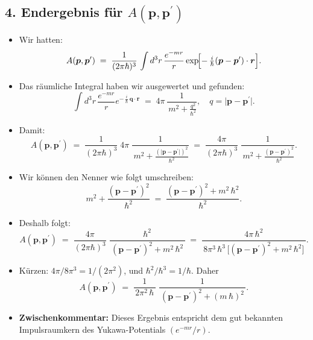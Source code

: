 \documentclass{scrartcl}
\begin{document}
\subsection*{4. Endergebnis für $A(\boldsymbol{p},\boldsymbol{p}^{\prime})$}
\begin{itemize}
  \item Wir hatten:
  \[
    A(\boldsymbol{p},\boldsymbol{p}^{\prime})
    \;=\;
    \frac{1}{(2\pi\hbar)^{3}}\,
    \int d^{3}r\,\frac{e^{-m r}}{r}
    \exp\!\Bigl[-\,\tfrac{i}{\hbar}(\boldsymbol{p}-\boldsymbol{p}^{\prime})\cdot\boldsymbol{r}\Bigr].
  \]
  \item Das räumliche Integral haben wir ausgewertet und gefunden:
  \[
    \int d^{3}r\,\frac{e^{-m r}}{r}
    e^{-\,\tfrac{i}{\hbar}\,\boldsymbol{q}\cdot\boldsymbol{r}}
    \;=\;
    4\pi\,
    \frac{1}{\,m^{2} + \tfrac{q^{2}}{\hbar^{2}}\!},
    \quad q = \lvert \boldsymbol{p} - \boldsymbol{p}^{\prime}\rvert.
  \]
  \item Damit:
  \[
    A(\boldsymbol{p},\boldsymbol{p}^{\prime})
    \;=\;
    \frac{1}{(2\pi\hbar)^{3}}\;
    4\pi\;\frac{1}{\,m^{2} + \tfrac{(\lvert \boldsymbol{p}-\boldsymbol{p}^{\prime}\rvert)^{2}}{\hbar^{2}}\!}
    \;=\;
    \frac{4\pi}{(2\pi\hbar)^{3}}\;
    \frac{1}{\,m^{2} + \tfrac{(\boldsymbol{p}-\boldsymbol{p}^{\prime})^{2}}{\hbar^{2}}\!}.
  \]
  \item Wir können den Nenner wie folgt umschreiben:
  \[
    m^{2} + \frac{(\boldsymbol{p}-\boldsymbol{p}^{\prime})^{2}}{\hbar^{2}}
    \;=\;
    \frac{(\boldsymbol{p}-\boldsymbol{p}^{\prime})^{2} + m^{2}\,\hbar^{2}}{\hbar^{2}}.
  \]
  \item Deshalb folgt:
  \[
    A(\boldsymbol{p},\boldsymbol{p}^{\prime})
    \;=\;
    \frac{4\pi}{(2\pi\hbar)^{3}}\;
    \frac{\hbar^{2}}{\,(\boldsymbol{p}-\boldsymbol{p}^{\prime})^{2} + m^{2}\,\hbar^{2}\,}
    \;=\;
    \frac{4\pi\,\hbar^{2}}{\,8\pi^{3}\,\hbar^{3}\,\bigl[(\boldsymbol{p}-\boldsymbol{p}^{\prime})^{2} + m^{2}\,\hbar^{2}\bigr]\,}.
  \]
  \item Kürzen: $4\pi/8\pi^{3} = 1/(2\pi^{2})$, und $\hbar^{2}/\hbar^{3} = 1/\hbar$. Daher
  \[
    \boxed{
      A(\boldsymbol{p},\boldsymbol{p}^{\prime})
      \;=\;
      \frac{1}{\,2\pi^{2}\,\hbar\,}\;
      \frac{1}{\,(\boldsymbol{p} - \boldsymbol{p}^{\prime})^{2} + (m\,\hbar)^{2}\,}.
    }
  \]
  \item \textbf{Zwischenkommentar:} 
    Dieses Ergebnis entspricht dem gut bekannten Impulsraumkern des Yukawa-Potentials $(e^{-m r}/r)$.
\end{itemize}
\end{document}
